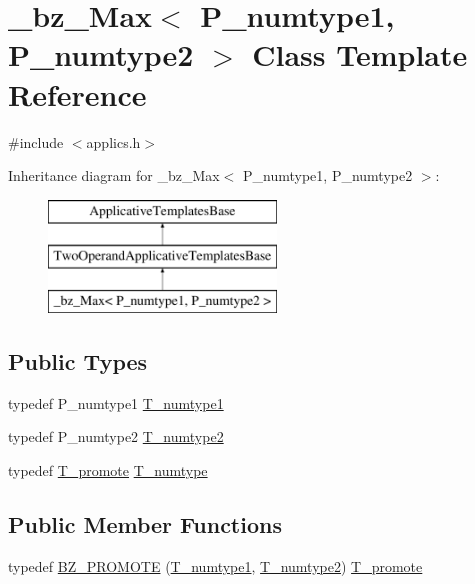 \hypertarget{class__bz__Max}{}\section{\+\_\+bz\+\_\+\+Max$<$ P\+\_\+numtype1, P\+\_\+numtype2 $>$ Class Template Reference}
\label{class__bz__Max}


{\ttfamily \#include $<$applics.\+h$>$}

Inheritance diagram for \+\_\+bz\+\_\+\+Max$<$ P\+\_\+numtype1, P\+\_\+numtype2 $>$\+:\begin{figure}[H]
\begin{center}
\leavevmode
\includegraphics[height=3.000000cm]{class__bz__Max}
\end{center}
\end{figure}
\subsection*{Public Types}
\begin{DoxyCompactItemize}
\item 
typedef P\+\_\+numtype1 \hyperlink{class__bz__Max_a9deab77fb52fb483561c3229432a1ead}{T\+\_\+numtype1}
\item 
typedef P\+\_\+numtype2 \hyperlink{class__bz__Max_a932ec2ae9acd204707f1083db9ab5062}{T\+\_\+numtype2}
\item 
typedef \hyperlink{minmax_8h_aaa88a440c2f0d00798d5b1d42c79308d}{T\+\_\+promote} \hyperlink{class__bz__Max_a2d3fc656c7448e085e9c61ccab4b7ddf}{T\+\_\+numtype}
\end{DoxyCompactItemize}
\subsection*{Public Member Functions}
\begin{DoxyCompactItemize}
\item 
typedef \hyperlink{class__bz__Max_aa6df994bdab3008914f980b80de96d26}{B\+Z\+\_\+\+P\+R\+O\+M\+O\+T\+E} (\hyperlink{class__bz__Max_a9deab77fb52fb483561c3229432a1ead}{T\+\_\+numtype1}, \hyperlink{class__bz__Max_a932ec2ae9acd204707f1083db9ab5062}{T\+\_\+numtype2}) \hyperlink{minmax_8h_aaa88a440c2f0d00798d5b1d42c79308d}{T\+\_\+promote}
\end{DoxyCompactItemize}
